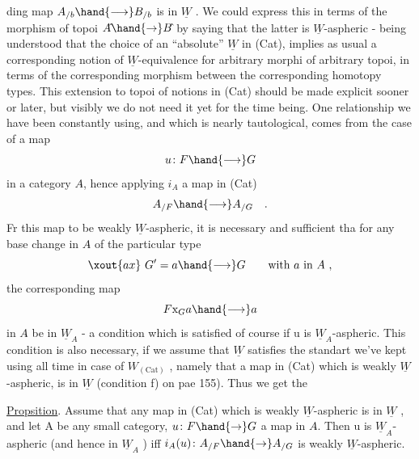 
ding map  $A_{/b}\hand{\longrightarrow} B_{/b}$  is in $\underline{W}$ .  We could express this in terms of the
morphism of topoi  $A\hat{}\hand{\to} B\hat{}$ by saying that the latter is $\underline{W}$-aspheric -
being understood that the choice of an ``absolute'' $\underline{W}$ in (Cat),  implies as
usual a corresponding notion of $\underline{W}$-equivalence for arbitrary  morphi
 of  arbitrary topoi,  in terms of the corresponding morphism between
the corresponding homotopy types. \hand{(}This extension to topoi of notions in
(Cat) should be made  explicit sooner or later,  but visibly we do not
need it  yet for the time being.\hand{)} One  relationship we have been
constantly using,  and which is nearly tautological,  comes from the case
of a map
\[ u\colon F\hand{\longrightarrow} G \]
in a category $A\hat{}$,  hence applying $i_A$ a map in (Cat)
\[ A_{/F}\hand{\longrightarrow} A_{/G} \quad . \]
Fr this map to be weakly $\underline{W}$-aspheric,  it is necessary and sufficient tha
for any base change in $A\hat{}$ of the particular type
\[ \xout{ax}\ G' = a \hand{\longrightarrow} G \qquad \text{with $a$ in $A$ ,} \]
the corresponding map
\[ F\mathrm{x}_G a \hand{\longrightarrow} a \]
in $A\hat{}$ be in $\underline{W}_A$ - a condition which  is satisfied of course if  u is
$\underline{W}_A$-aspheric.  This  condition is also necessary,  if we assume that $\underline{W}$
satisfies the standart  we've kept using all time in case of
$W_{(\mathrm{Cat})}$ ,  namely that a map in (Cat) which is weakly $\underline{W}$-aspheric,  is in
$\underline{W}$  (condition  f)  on pae 155).   Thus we get the

\uline{Propsition}.  Assume that any map in (Cat) which is weakly $\underline{W}$-aspheric is
in $\underline{W}$ ,  and let  A be any small category,  $u\colon F\hand{\to} G$ a map in $A\hat{}$. Then u
is  $\underline{W}_A$-aspheric (and hence in $\underline{W}_A$ )  iff  $i_A(u)\colon A_{/F}\hand{\to} A_{/G}$
is weakly $\underline{W}$-aspheric.


